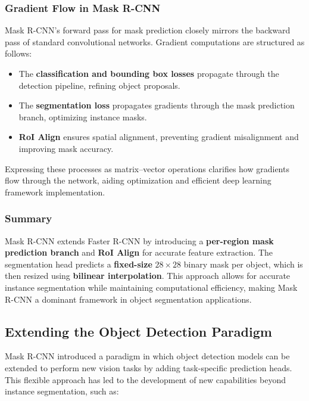 \subsubsection{Gradient Flow in Mask R-CNN}

\noindent Mask R-CNN’s forward pass for mask prediction closely mirrors the backward pass of standard convolutional networks. Gradient computations are structured as follows:

\begin{itemize}
	\item The \textbf{classification and bounding box losses} propagate through the detection pipeline, refining object proposals.
	\item The \textbf{segmentation loss} propagates gradients through the mask prediction branch, optimizing instance masks.
	\item \textbf{RoI Align} ensures spatial alignment, preventing gradient misalignment and improving mask accuracy.
\end{itemize}

\noindent Expressing these processes as matrix--vector operations clarifies how gradients flow through the network, aiding optimization and efficient deep learning framework implementation.

\subsubsection{Summary}

\noindent Mask R-CNN extends Faster R-CNN by introducing a \textbf{per-region mask prediction branch} and \textbf{RoI Align} for accurate feature extraction. The segmentation head predicts a \textbf{fixed-size} $28 \times 28$ binary mask per object, which is then resized using \textbf{bilinear interpolation}. This approach allows for accurate instance segmentation while maintaining computational efficiency, making Mask R-CNN a dominant framework in object segmentation applications.

\subsection{Extending the Object Detection Paradigm}

\noindent Mask R-CNN introduced a paradigm in which object detection models can be extended to perform new vision tasks by adding task-specific prediction heads. This flexible approach has led to the development of new capabilities beyond instance segmentation, such as:

